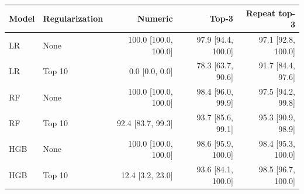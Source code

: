 \begin{tabular}{llrrr}
\toprule
Model & Regularization & Numeric & Top-3 & Repeat top-3 \\
\midrule
LR & None & 100.0 [100.0, 100.0] & 97.9 [94.4, 100.0] & 97.1 [92.8, 100.0] \\
LR & Top 10 & 0.0 [0.0, 0.0] & 78.3 [63.7, 90.6] & 91.7 [84.4, 97.6] \\
RF & None & 100.0 [100.0, 100.0] & 98.4 [96.0, 99.9] & 97.5 [94.2, 99.8] \\
RF & Top 10 & 92.4 [83.7, 99.3] & 93.7 [85.6, 99.1] & 95.3 [90.9, 98.9] \\
HGB & None & 100.0 [100.0, 100.0] & 98.6 [95.9, 100.0] & 98.4 [95.3, 100.0] \\
HGB & Top 10 & 12.4 [3.2, 23.0] & 93.6 [84.1, 100.0] & 98.5 [96.7, 100.0] \\
\bottomrule
\end{tabular}